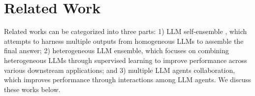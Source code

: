 \section{Related Work}


Related works can be categorized into three parts: 1) LLM self-ensemble \cite{cotsc}, which attempts to harness multiple outputs from homogeneous LLMs to assemble the final answer; 2) heterogeneous LLM ensemble, which focuses on combining heterogeneous LLMs through supervised learning to improve performance across various downstream applications; and 3) multiple LLM agents collaboration, which improves performance through interactions among LLM agents. We discuss these works below. 









